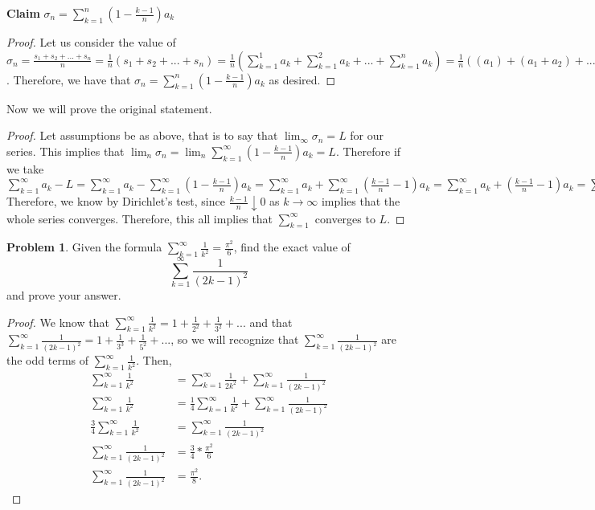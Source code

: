 \documentclass[11pt]{article}
\theoremstyle{definition}
\newtheorem{problem}{Problem}
\begin{document}
\textbf{Claim} $\sigma_n = \sum_{k = 1}^{n} \left( 1 - \frac{k-1}{n} \right) a_k$
\begin{proof}
Let us consider the value of $\sigma_n = \frac{s_1 + s_2 + ... + s_n}{n} = \frac{1}{n}(s_1+s_2+...+s_n) = \frac{1}{n}(\sum_{k=1}^1a_k + \sum_{k=1}^2a_k + ... + \sum_{k=1}^na_k) = \frac{1}{n} ((a_1) + (a_1 + a_2) + ... (a_1 + a_2 + ... + a_n)) = \frac{1}{n} (n(a_1) + (n-1)(a_2) + ... 2(a_{n-1}) + a_n) = a_1 + \frac{(n-1)a_2}{n} + ... + \frac{2a_{n-1}}{n} + \frac{a_n}{n} = (a_1 - 0) + (a_2 - \frac{(2-1)a_2}{n}) + (a_3-\frac{(3-1)a_3}{n}) + ... (a_n - \frac{(n-1)a_n}{n}) = \sum_{k=1}^n(1-\frac{k-1}{n})a_k$. Therefore, we have that $\sigma_n = \sum_{k = 1}^{n} \left( 1 - \frac{k-1}{n} \right) a_k$ as desired.
\end{proof}
Now we will prove the original statement.
\begin{proof}
Let assumptions be as above, that is to say that $\lim_\infty \sigma_n = L$ for our series. This implies that $\lim_n\sigma_n = \lim_n \sum_{k=1}^\infty (1-\frac{k-1}{n})a_k = L$. Therefore if we take $\sum_{k=1}^\infty a_k - L = \sum_{k=1}^\infty a_k - \sum_{k=1}^\infty (1-\frac{k-1}{n})a_k = \sum_{k=1}^\infty a_k + \sum_{k=1}^\infty (\frac{k-1}{n}-1)a_k = \sum_{k=1}^\infty a_k + (\frac{k-1}{n} - 1)a_k = \sum_{k=1}^\infty a_k(1 + \frac{k-1}{n}-1) = \sum_{k=1}^\infty a_k(\frac{k-1}{n}).$ Therefore, we know by Dirichlet's test, since $\frac{k-1}{n} \downarrow 0$ as $k\to \infty$ implies that the whole series converges. Therefore, this all implies that $\sum_{k=1}^\infty$ converges to $L.$
\end{proof}

\pagebreak
\begin{problem}
Given the formula $\sum_{k = 1}^\infty \frac{1}{k^2} = \frac{\pi^2}{6}$, find the exact value of 
\[
\sum_{k = 1}^\infty \frac{1}{(2 k - 1)^2} 
\]
and prove your answer. 
\end{problem}

\begin{proof}
We know that $\sum_{k=1}^\infty \frac{1}{k^2} = 1 + \frac{1}{2^2} + \frac{1}{3^2} + ...$ and that $\sum_{k = 1}^\infty \frac{1}{(2 k - 1)^2} = 1 + \frac{1}{3^3} + \frac{1}{5^2} + ...$, so we will recognize that $\sum_{k = 1}^\infty \frac{1}{(2 k - 1)^2}$ are the odd terms of $\sum_{k = 1}^\infty \frac{1}{k^2}$. Then,
\begin{align*}
    \sum_{k = 1}^\infty \frac{1}{k^2} &= \sum_{k = 1}^\infty \frac{1}{2k^2} + \sum_{k = 1}^\infty \frac{1}{(2 k - 1)^2}\\
    \sum_{k = 1}^\infty \frac{1}{k^2} &= \frac{1}{4} \sum_{k = 1}^\infty \frac{1}{k^2} + \sum_{k = 1}^\infty \frac{1}{(2 k - 1)^2}\\
    \frac{3}{4} \sum_{k = 1}^\infty \frac{1}{k^2} &= \sum_{k = 1}^\infty \frac{1}{(2 k - 1)^2} \\
    \sum_{k = 1}^\infty \frac{1}{(2 k - 1)^2}  &= \frac{3}{4} * \frac{\pi^2}{6}\\
    \sum_{k = 1}^\infty \frac{1}{(2 k - 1)^2}  &= \frac{\pi^2}{8}.
\end{align*}
\end{proof}
\end{document}
